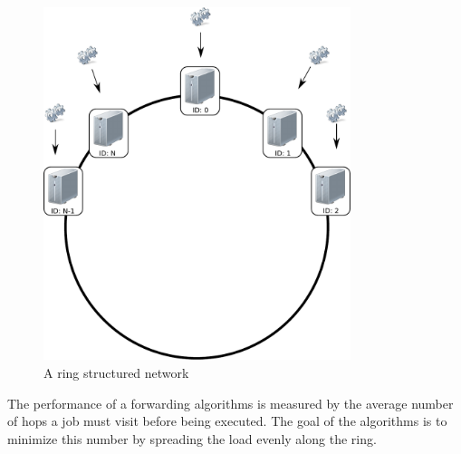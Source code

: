 \documentclass[10pt,a4paper,titlepage]{article}
\begin{document}
\begin{figure}[h!tb]
\centering
\includegraphics[width=0.8\textwidth,clip=true,trim=0px 225px 0px 0px]{resources/ring.pdf}
\caption{A ring structured network}
\label{figlr}
\end{figure}

The performance of a forwarding algorithms is measured by the average number of hops a job must visit before being executed. The goal of the algorithms is to minimize this number by spreading the load evenly along the ring. 


%
\end{document}
